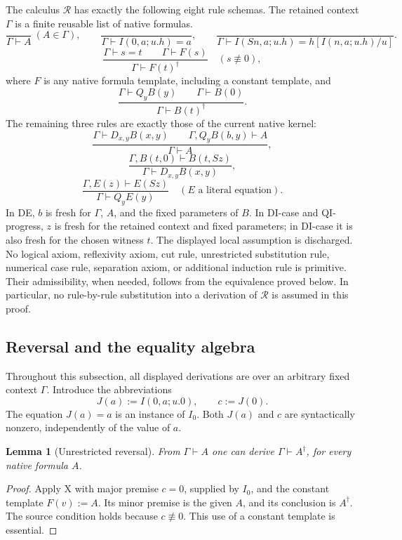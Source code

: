 \documentclass[11pt,letterpaper]{article}
\newtheorem{lemma}[theorem]{Lemma}
\theoremstyle{definition}\newtheorem{definition}[theorem]{Definition}
\theoremstyle{remark}\newtheorem{remark}[theorem]{Remark}
\begin{document}
The calculus $\mathcal R$ has exactly the following eight rule schemas.
The retained context $\Gamma$ is a finite reusable list of native
formulas.
\[
 \frac{}{\Gamma\vdash A}\ (A\in\Gamma),\qquad
 \frac{}{\Gamma\vdash I(0,a;u.h)=a},\qquad
 \frac{}{\Gamma\vdash I(Sn,a;u.h)=h[I(n,a;u.h)/u]}.
 \tag{Hyp, $I_0$, $I_S$}\label{rev:initial}
\]
\[
 \frac{\Gamma\vdash s=t\qquad\Gamma\vdash F(s)}
      {\Gamma\vdash F(t)^\dagger}
 \quad(s\not\equiv0),
 \tag{X}\label{rev:x}
\]
where $F$ is any native formula template, including a constant template,
and
\[
 \frac{\Gamma\vdash Q_yB(y)\qquad\Gamma\vdash B(0)}
      {\Gamma\vdash B(t)^\dagger}.
 \tag{QX}\label{rev:qx}
\]
The remaining three rules are exactly those of the current native kernel:
\[
 \frac{\Gamma\vdash D_{x,y}B(x,y)
       \qquad\Gamma,Q_yB(b,y)\vdash A}
      {\Gamma\vdash A},
 \tag{DE}\label{rev:de}
\]
\[
 \frac{\Gamma,B(t,0)\vdash B(t,Sz)}
      {\Gamma\vdash D_{x,y}B(x,y)},
 \tag{DI-case}\label{rev:di}
\]
\[
 \frac{\Gamma,E(z)\vdash E(Sz)}
      {\Gamma\vdash Q_yE(y)}
 \quad(E\text{ a literal equation}).
 \tag{QI-progress}\label{rev:qi}
\]
In DE, $b$ is fresh for $\Gamma$, $A$, and the fixed parameters of $B$.
In DI-case and QI-progress, $z$ is fresh for the retained context and
fixed parameters; in DI-case it is also fresh for the chosen witness
$t$. The displayed local assumption is discharged. No logical axiom,
reflexivity axiom, cut rule, unrestricted substitution rule, numerical
case rule, separation axiom, or additional induction rule is primitive.
Their admissibility, when needed, follows from the equivalence proved
below. In particular, no rule-by-rule substitution into a derivation of
$\mathcal R$ is assumed in this proof.

\subsection{Reversal and the equality algebra}

Throughout this subsection, all displayed derivations are over an
arbitrary fixed context $\Gamma$. Introduce the abbreviations
\[
             J(a):=I(0,a;u.0),\qquad c:=J(0).
 \label{rev:j}
\]
The equation $J(a)=a$ is an instance of $I_0$. Both $J(a)$ and $c$
are syntactically nonzero, independently of the value of $a$.

\begin{lemma}[Unrestricted reversal]\label{rev:reverse}
From $\Gamma\vdash A$ one can derive $\Gamma\vdash A^\dagger$,
for every native formula $A$.
\end{lemma}
\begin{proof}
Apply X with major premise $c=0$, supplied by $I_0$, and the constant
template $F(v):=A$. Its minor premise is the given $A$, and its
conclusion is $A^\dagger$. The source condition holds because
$c\not\equiv0$. This use of a constant template is essential.
\end{proof}
\end{document}
